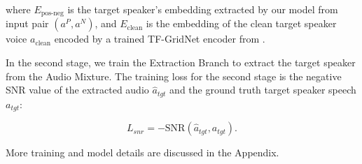 where $E_{\text{pos-neg}}$ is the target speaker's embedding extracted by our model from input pair $(a^P, a^N)$, and $E_{\text{clean}}$ is the embedding of the clean target speaker voice $a_{\text{clean}}$ encoded by a trained TF-GridNet encoder from \cite{Veluri2024lookonce}.

In the second stage, we train the Extraction Branch to extract the target speaker from the Audio Mixture. The training loss for the second stage is the negative SNR value of the extracted audio $\hat{a}_{tgt}$ and the ground truth target speaker speech $a_{tgt}$: 

\begin{equation}
L_{snr} = -\text{SNR}(\hat{a}_{tgt}, a_{tgt}).
\end{equation}


More training and model details are discussed in the Appendix. 












